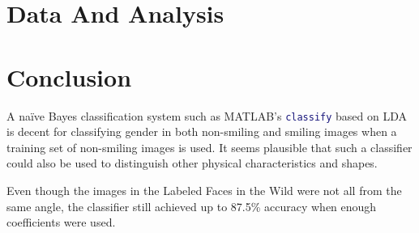 \documentclass[hidelinks,11pt]{article}
\begin{document}

\section{Data And Analysis}



\section{Conclusion}

A na\"ive Bayes classification system such as MATLAB's
\lstinline[language=Matlab]!classify! based on LDA is decent for classifying
gender in both non-smiling and smiling images when a training set of non-smiling
images is used. It seems plausible that such a classifier could also be used to
distinguish other physical characteristics and shapes. 

Even though the images in the Labeled Faces in the Wild were not all from the
same angle, the classifier still achieved up to 87.5\% accuracy when enough
coefficients were used. 


\end{document}
